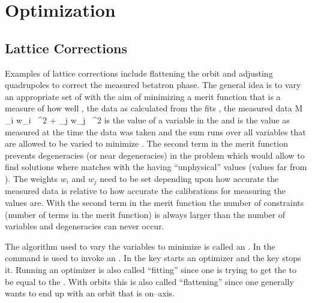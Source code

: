 \chapter{Optimization}
\label{c:opti}

\section{Lattice Corrections}

Examples of lattice corrections include flattening the orbit and
adjusting quadrupoles to correct the measured betatron phase. The
general idea is to vary an appropriate set of  with the
aim of minimizing a merit function  that is a measure of how
well , the data as calculated from the  fits
, the measured data
\Begineq
  {\cal M} \equiv \sum_{i} w_i \,
    ^2 + 
  \sum_{j} w_j \,
    ^2
  \label{m1}
\Endeq
{} is the value of a variable in the  and
 is the value as measured at the time the data was taken
and the sum  runs over all variables that are allowed to be
varied to minimize . The second term in the merit function
prevents degeneracies (or near degeneracies) in the problem which
would allow \tao to find solutions where  matches
 with the  having ``unphysical''
values (values far from ). The weights $w_i$ and $w_j$
need to be set depending upon how accurate the measured data is
relative to how accurate the calibrations for measuring the
 values are. With the second term in the merit function
the number of constraints (number of terms in the merit function) is
always larger than the number of variables and degeneracies can never
occur. 

The algorithm used to vary the  variables to minimize
 is called an . In  the
 command is used to invoke an . In  the  key starts an optimizer and the  key stops it.
Running an optimizer is also called ``fitting'' since one is trying to
get the  to be equal to the . With orbits
this is also called ``flattening'' since one generally wants to end up
with an orbit that is on--axis.

